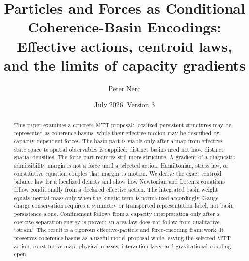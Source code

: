 \documentclass[11pt]{article}
\title{\textbf{Particles and Forces as Conditional Coherence-Basin Encodings:}\\
\large Effective actions, centroid laws, and the limits of capacity gradients}
\author{Peter Nero}
\date{July 2026, Version 3}
\begin{document}
\maketitle

\begin{abstract}
This paper examines a concrete MTT proposal: localized persistent structures
may be represented as coherence basins, while their effective motion may be
described by capacity-dependent forces.  The basin part is viable only after a
map from effective state space to spatial observables is supplied; distinct
basins need not have distinct spatial densities.  The force part requires still
more structure.  A gradient of a diagnostic admissibility margin is not a force
until a selected action, Hamiltonian, stress law, or constitutive equation
couples that margin to motion.  We derive the exact centroid balance law for a
localized density and show how Newtonian and Lorentz equations follow
conditionally from a declared effective action.  The integrated basin weight
equals inertial mass only when the kinetic term is normalized accordingly.
Gauge charge conservation requires a symmetry or transported representation
label, not basin persistence alone.  Confinement follows from a capacity
interpretation only after a coercive separation energy is proved; an area law
does not follow from qualitative ``strain.''  The result is a rigorous
effective-particle and force-encoding framework.  It preserves coherence basins
as a useful model proposal while leaving the selected MTT action, constitutive
map, physical masses, interaction laws, and gravitational coupling open.
\end{abstract}
\end{document}
